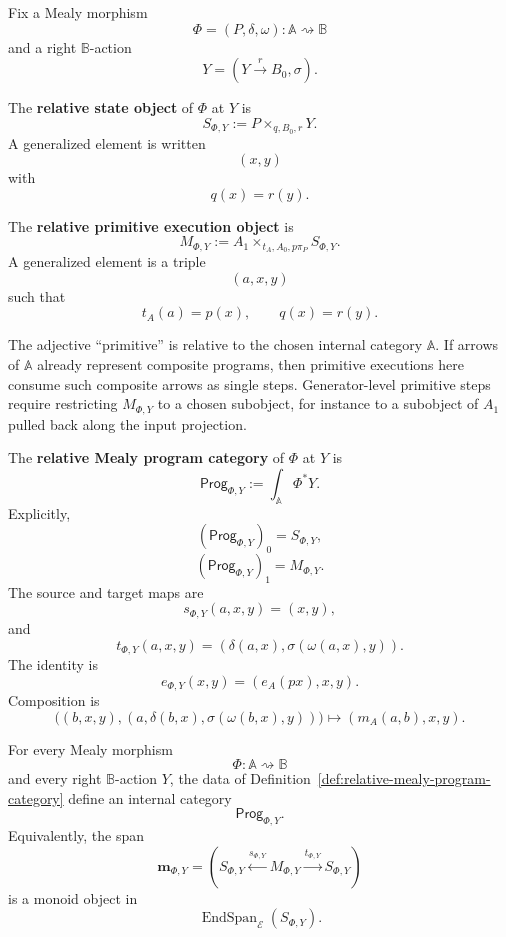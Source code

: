 Fix a Mealy morphism
\[
\Phi=(P,\delta,\omega):\mathbb A\rightsquigarrow\mathbb B
\]
and a right \(\mathbb B\)-action
\[
Y=(Y\xrightarrow{r}B_0,\sigma).
\]

\begin{definition}
\label{def:relative-state-object}
The \textbf{relative state object} of \(\Phi\) at \(Y\) is
\[
S_{\Phi,Y}:=P\times_{q,B_0,r}Y.
\]
A generalized element is written
\[
(x,y)
\]
with
\[
q(x)=r(y).
\]
\end{definition}

\begin{definition}
\label{def:relative-primitive-execution-object}
The \textbf{relative primitive execution object} is
\[
M_{\Phi,Y}
:=
A_1\times_{t_A,A_0,p\pi_P}S_{\Phi,Y}.
\]
A generalized element is a triple
\[
(a,x,y)
\]
such that
\[
t_A(a)=p(x),
\qquad
q(x)=r(y).
\]
\end{definition}

\begin{remark}
\label{rem:primitive-relative-to-input-category}
The adjective ``primitive'' is relative to the chosen internal category
\(\mathbb A\). If arrows of \(\mathbb A\) already represent composite
programs, then primitive executions here consume such composite arrows as
single steps. Generator-level primitive steps require restricting
\(M_{\Phi,Y}\) to a chosen subobject, for instance to a subobject of
\(A_1\) pulled back along the input projection.
\end{remark}

\begin{definition}
\label{def:relative-mealy-program-category}
The \textbf{relative Mealy program category} of \(\Phi\) at \(Y\) is
\[
\mathsf{Prog}_{\Phi,Y}
:=
\int_{\mathbb A}\Phi^\ast Y.
\]
Explicitly,
\[
(\mathsf{Prog}_{\Phi,Y})_0=S_{\Phi,Y},
\]
\[
(\mathsf{Prog}_{\Phi,Y})_1=M_{\Phi,Y}.
\]
The source and target maps are
\[
s_{\Phi,Y}(a,x,y)=(x,y),
\]
and
\[
t_{\Phi,Y}(a,x,y)
=
\left(
\delta(a,x),
\sigma(\omega(a,x),y)
\right).
\]
The identity is
\[
e_{\Phi,Y}(x,y)=(e_A(px),x,y).
\]
Composition is
\[
\bigl((b,x,y),(a,\delta(b,x),\sigma(\omega(b,x),y))\bigr)
\longmapsto
(m_A(a,b),x,y).
\]
\end{definition}

\begin{theorem}
\label{thm:relative-program-category}
For every Mealy morphism
\[
\Phi:\mathbb A\rightsquigarrow\mathbb B
\]
and every right \(\mathbb B\)-action \(Y\), the data of
Definition~\ref{def:relative-mealy-program-category} define an internal
category
\[
\mathsf{Prog}_{\Phi,Y}.
\]
Equivalently, the span
\[
\mathbf m_{\Phi,Y}
=
\left(
S_{\Phi,Y}
\xleftarrow{s_{\Phi,Y}}
M_{\Phi,Y}
\xrightarrow{t_{\Phi,Y}}
S_{\Phi,Y}
\right)
\]
is a monoid object in
\[
\operatorname{EndSpan}_{\mathcal E}(S_{\Phi,Y}).
\]
\end{theorem}

